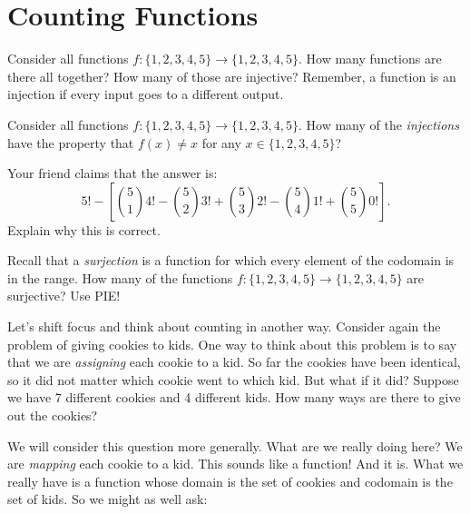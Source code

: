 \documentclass[12pt]{article}
\begin{document}

\section{Counting Functions}\label{sec:count-functions}




\begin{activity}
\begin{questions}
\question Consider all functions $f: \{1,2,3,4,5\} \to \{1,2,3,4,5\}$.  How many functions are there all together?  How many of those are injective?  Remember, a function is an injection if every input goes to a different output.

\question Consider all functions $f: \{1,2,3,4,5\} \to \{1,2,3,4,5\}$.  How many of the {\em injections} have the property that $f(x) \ne x$ for any $x \in \{1,2,3,4,5\}$?

Your friend claims that the answer is:
\[5! - \left[ {5\choose 1}4! - {5 \choose 2}3! + {5\choose 3}2! - {5 \choose 4}1! + {5\choose 5}0! \right].\]
Explain why this is correct.

\question Recall that a {\em surjection} is a function for which every element of the codomain is in the range.  How many of the functions $f: \{1,2,3,4,5\} \to \{1,2,3,4,5\}$ are surjective?  Use PIE!

\end{questions}
\end{activity}

Let's shift focus and think about counting in another way.  Consider again the problem of giving cookies to kids.  One way to think about this problem is to say that we are {\em assigning} each cookie to a kid.  So far the cookies have been identical, so it did not matter which cookie went to which kid.  But what if it did?  Suppose we have 7 different cookies and 4 different kids.  How many ways are there to give out the cookies?

We will consider this question more generally.  What are we really doing here?  We are {\em mapping} each cookie to a kid.  This sounds like a function!  And it is.  What we really have is a function whose domain is the set of cookies and codomain is the set of kids.  So we might as well ask:
\end{document}

